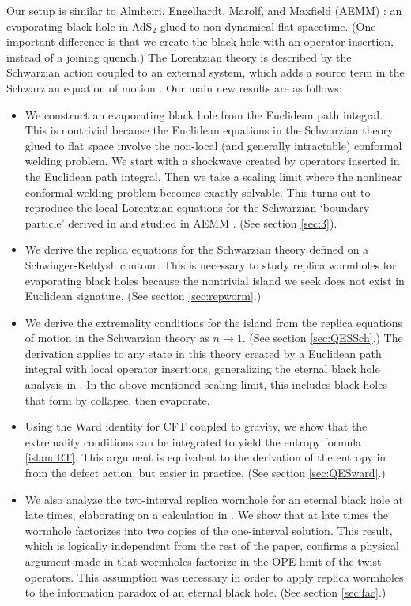 \documentclass[11pt,oneside,letterpaper]{article}
\numberwithin{equation}{section}
\begin{document}
\begin{spacing}{1.1}
Our setup is similar to Almheiri, Engelhardt, Marolf, and Maxfield (AEMM) \cite{Almheiri:2019psf}: an evaporating black hole in AdS$_2$ glued to non-dynamical flat spacetime. (One important difference is that we create the black hole with an operator insertion, instead of a joining quench.) The Lorentzian theory is described by the Schwarzian action coupled to an external system, which adds a source term in the Schwarzian equation of motion \cite{Maldacena:2016upp,Engelsoy:2016xyb,Jensen:2016pah}. Our main new results are as follows:
\begin{itemize}
\item We construct an evaporating black hole from the Euclidean path integral. This is nontrivial because the Euclidean equations in the Schwarzian theory glued to flat space involve the non-local (and generally intractable) conformal welding problem. We start with a shockwave created by operators inserted in the Euclidean path integral. Then we take a scaling limit where the nonlinear conformal welding problem becomes exactly solvable. This turns out to reproduce the local Lorentzian equations for the Schwarzian `boundary particle' derived in \cite{Maldacena:2016upp,Engelsoy:2016xyb} and studied in AEMM \cite{Almheiri:2019psf}. (See section \ref{sec:3}).
\item We derive the replica equations for the Schwarzian theory defined on a Schwinger-Keldysh contour. This is necessary to study replica wormholes for evaporating black holes because the nontrivial island we seek does not exist in Euclidean signature.  (See section \ref{sec:repworm}.)
\item We derive the extremality conditions for the island from the replica equations of motion in the Schwarzian theory as $n \to 1$. (See section \ref{sec:QESSch}.) The derivation applies to any state in this theory created by a Euclidean path integral with local operator insertions, generalizing the eternal black hole analysis in \cite{Almheiri:2019qdq}. In the above-mentioned scaling limit, this includes black holes that form by collapse, then evaporate.
\item Using the Ward identity for CFT coupled to gravity, we show that the extremality conditions can be integrated to yield the entropy formula \eqref{islandRT}. This argument is equivalent to the derivation of the entropy in \cite{Almheiri:2019qdq,Penington:2019kki} from the defect action, but easier in practice. (See section \ref{sec:QESward}.)
\item We also analyze the two-interval replica wormhole for an eternal black hole at late times, elaborating on a calculation in \cite{Almheiri:2019qdq}. We show that at late times the wormhole factorizes into two copies of the one-interval solution. This result, which is logically independent from the rest of the paper, confirms a physical argument made in \cite{Almheiri:2019qdq} that wormholes factorize in the OPE limit of the twist operators. This assumption was necessary in order to apply replica wormholes to the information paradox of an eternal black hole. (See section \ref{sec:fac}.)

\end{itemize}
\end{spacing}
\end{document}
